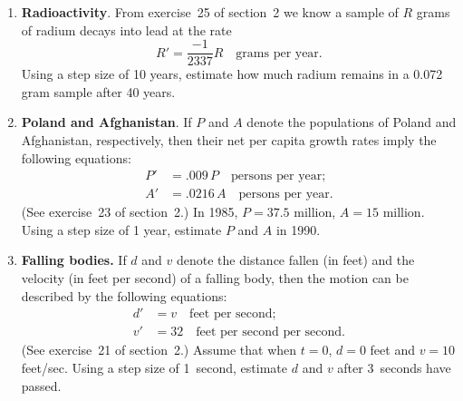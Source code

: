 \begin{enumerate}
\item {\bf Radioactivity}. From exercise~25 of
section~2 we know a sample of $R$ grams of radium decays into lead at
the rate
\[
R' = \dfrac{-1}{2337} R \quad \mbox{grams per year} .
\]
Using a step size of 10 years, estimate how much radium remains in a
0.072 gram sample after 40 years.


\item {\bf Poland and Afghanistan}. If
$P$ and $A$ denote the populations of Poland and Afghanistan,
respectively, then their net per capita growth rates imply the
following equations:
\begin{align*}
P' &= .009 \, P \quad \mbox{persons per year;} \\
A' &= .0216 \, A \quad \mbox{persons per year.} 
\end{align*}
(See exercise~23 of section~2.)  In 1985, $P = 37.5$ million, $A = 15$
million.  Using a step size of 1 year, estimate $P$ and $A$ in 1990.


\item {\bf Falling bodies.}  If $d$ and $v$ denote the distance fallen
(in feet) and the velocity (in feet per second) of a falling body,
then the motion can be described by the following equations:
\begin{align*}
d' &= v  \quad \mbox{feet per second};\\
v' &= 32 \quad \mbox{feet per second per second}.
\end{align*}
(See exercise~21 of section~2.)  Assume that when $t=0$, $d=0$ feet and
$v=10$ feet/sec.  Using a step size of 1~second, estimate $d$ and $v$
after 3~seconds have passed.

\cleardoublepage
\end{enumerate}